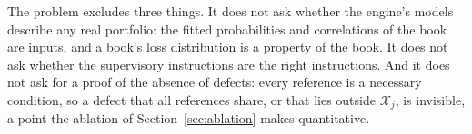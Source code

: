 The problem excludes three things. It does not ask whether the engine's models describe any real portfolio: the fitted probabilities and correlations of the book are inputs, and a book's loss distribution is a property of the book. It does not ask whether the supervisory instructions are the right instructions. And it does not ask for a proof of the absence of defects: every reference is a necessary condition, so a defect that all references share, or that lies outside $\mathcal{X}_j$, is invisible, a point the ablation of Section~\ref{sec:ablation} makes quantitative.


